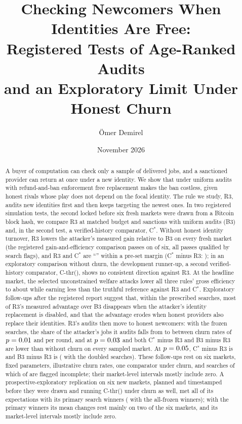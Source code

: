 \documentclass[11pt]{article}
\title{Checking Newcomers When Identities Are Free:\\Registered Tests of Age-Ranked Audits\\and an Exploratory Limit Under Honest Churn}
\author{Ömer Demirel}
\date{November 2026}
\begin{document}
\maketitle

\begin{abstract}
A buyer of computation can check only a sample of delivered jobs, and a sanctioned provider can return at once under a new identity. We show that under uniform audits with refund-and-ban enforcement free replacement makes the ban costless, given honest rivals whose play does not depend on the focal identity. The rule we study, R3, audits new identities first and then keeps targeting the newest ones. In two registered simulation tests, the second locked before six fresh markets were drawn from a Bitcoin block hash, we compare R3 at matched budget and sanctions with uniform audits (B3) and, in the second test, a verified-history comparator, C$^*$. Without honest identity turnover, R3 lowers the attacker's measured gain relative to B3 on every fresh market (the registered gain-and-efficiency comparison passes on  of six, all passes qualified by search flags), and R3 and C$^*$ are ``'' within a pre-set margin (C$^*$ minus R3: ); in an exploratory comparison without churn, the development runner-up, a second verified-history comparator, C-thr(), shows no consistent direction against R3. At the headline market, the selected unconstrained welfare attacks lower all three rules' gross efficiency to about  while earning less than the truthful reference against R3 and C$^*$.
Exploratory follow-ups after the registered report suggest that, within the prescribed searches, most of R3's measured advantage over B3 disappears when the attacker's identity replacement is disabled, and that the advantage erodes when honest providers also replace their identities. R3's audits then move to honest newcomers: with the frozen searches, the share of the attacker's jobs it audits falls from  to  between churn rates of $p = 0.01$ and  per round, and at $p = 0.03$ and  both C$^*$ minus R3 and B3 minus R3 are lower than without churn on every sampled market. At $p = 0.05$, C$^*$ minus R3 is  and B3 minus R3 is  ( with the doubled searches). These follow-ups rest on six markets, fixed parameters, illustrative churn rates, one comparator under churn, and searches of which  of  are flagged incomplete; their market-level intervals mostly include zero. A prospective-exploratory replication on six new markets, planned and timestamped before they were drawn and running C-thr() under churn as well, met all  of its expectations with its primary search winners ( with the all-frozen winners); with the primary winners its mean changes rest mainly on two of the six markets, and its market-level intervals mostly include zero.
\end{abstract}
\end{document}
